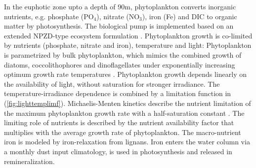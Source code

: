 In the euphotic zone upto a depth of 90m, phytoplankton converts inorganic nutrients, e.g. phosphate (PO$_4$), nitrate (NO$_3$), iron (Fe) and \acs{DIC} to organic matter by photosynthesis. %
The biological pump \citep{VolkHoffert1985} is implemented based on an extended \acs{NPZD}-type ecosystem formulation \citep{Six1996}. Phytoplankton growth is co-limited by nutrients (phosphate, nitrate and iron), temperature and light: Phytoplankton is parametrized by bulk phytoplankton, which mimics the combined growth of diatoms, coccolithophores and dinoflagellates under exponentially increasing optimum growth rate temperatures \citep{Eppley1972}. 
Phytoplankton growth depends linearly on the availability of light, without saturation for stronger irradiance. The temperature-irradiance dependence is combined by a limitation function in \cite{Smith1936} (\autoref{fig:lighttemplimf}). 
Michaelis-Menten kinetics describe the nutrient limitation of the maximum phytoplankton growth rate with a half-saturation constant \citep{MichaelisMenten1913}. The limiting role of nutrients is described by the nutrient availability factor that multiplies with the average growth rate of phytoplankton. 
The macro-nutrient iron is modeled by iron-relaxation from lignans. Iron enters the water column via a monthly dust input climatology, is used in photosynthesis and released in remineralization.%








